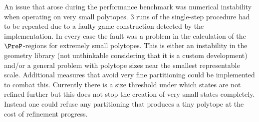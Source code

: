     An issue that arose during the performance benchmark was numerical instability when operating on very small polytopes.
    3 runs of the single-step procedure had to be repeated due to a faulty game construction detected by the implementation.
    In every case the fault was a problem in the calculation of the $\PreP$-regions for extremely small polytopes.
    This is either an instability in the geometry library (not unthinkable considering that it is a custom development) and/or a general problem with polytope sizes near the smallest representable scale.
    Additional measures that avoid very fine partitioning could be implemented to combat this.
    Currently there is a size threshold under which states are not refined further but this does not stop the creation of very small states completely.
    Instead one could refuse any partitioning that produces a tiny polytope at the cost of refinement progress.

\stopsubsection

\startsubsection[title={Neutral Refinement},reference=sec:cases-integrator-neutral]



